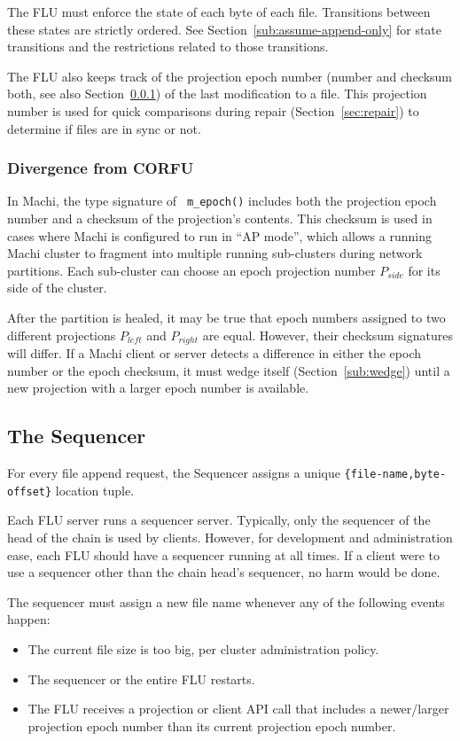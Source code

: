 \documentclass[preprint,10pt]{sigplanconf}
\begin{document}
The FLU must enforce the state of each byte of each file.
Transitions between these states are strictly ordered.
See Section~\ref{sub:assume-append-only} for state transitions and
the restrictions related to those transitions.

The FLU also keeps track of the projection epoch number (number and checksum
both, see also Section~\ref{sub:flu-divergence}) of the last modification to a
file.  This projection number is used for quick comparisons during
repair (Section~\ref{sec:repair}) to determine if files are in sync or
not.

\subsubsection{Divergence from CORFU}
\label{sub:flu-divergence}

In Machi, the type signature of {\tt
  m\_epoch()} includes both the projection epoch number and a checksum
of the projection's contents.  This checksum is used in cases where
Machi is configured to run in ``AP mode'', which allows a running Machi
cluster to fragment into multiple running sub-clusters during network
partitions.  Each sub-cluster can choose an epoch projection number
$P_{side}$ for its side of the cluster.

After the partition is
healed, it may be true that epoch numbers assigned to two different
projections $P_{left}$ and  $P_{right}$
are equal.  However, their checksum signatures will differ.  If a
Machi client or server detects a difference in either the epoch number
or the epoch checksum, it must wedge itself (Section~\ref{sub:wedge})
until a new projection with a larger epoch number is available.

\subsection{The Sequencer}
\label{sub:sequencer}

For every file append request, the Sequencer assigns a unique
{\tt \{file-name,byte-offset\}} location tuple.

Each FLU server runs a sequencer server.  Typically, only the
sequencer of the head of the chain is used by clients.  However, for
development and administration ease, each FLU should have a sequencer
running at all times.  If a client were to use a sequencer other than
the chain head's sequencer, no harm would be done.

The sequencer must assign a new file name whenever any of the
following events happen:
\begin{itemize}
\item The current file size is too big, per cluster administration policy.
\item The sequencer or the entire FLU restarts.
\item The FLU receives a projection or client API call
  that includes a newer/larger projection epoch
  number than its current projection epoch number.
\end{itemize}
\end{document}
